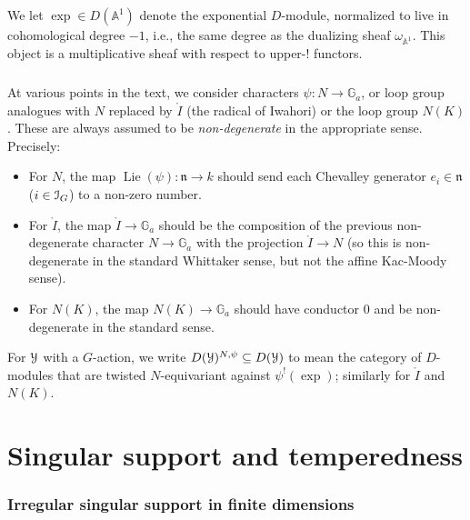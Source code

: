 \documentclass[reqno,11pt]{amsart}
\numberwithin{equation}{subsection}
\theoremstyle{remark}
\newcommand{\bA}{{\mathbb A}}
\newcommand{\bG}{{\mathbb G}}
\newcommand{\sI}{{\EuScript I}}
\newcommand{\sY}{{\EuScript Y}}
\newcommand{\fn}{{\mathfrak n}}
\newcommand{\on}{\operatorname}
\newcommand{\Lie}{\on{Lie}}
\renewcommand{\o}[1]{\mathring{#1}}
\renewcommand{\subset}{\subseteq}
\begin{document}
\subsubsection{}

We let $\exp \in D(\bA^1)$ denote the exponential $D$-module, normalized
to live in cohomological degree $-1$, i.e., the same degree as 
the dualizing sheaf $\omega_{\bA^1}$. This object is a multiplicative sheaf
with respect to upper-$!$ functors.

\subsubsection{}

At various points in the text, we consider characters $\psi:N \to \bG_a$, or
loop group analogues with $N$ replaced by $\o{I}$ (the radical of
Iwahori) or the loop group $N(K)$. These are always assumed to be
\emph{non-degenerate} in the appropriate sense. Precisely:

\begin{itemize}

\item For $N$, the map $\Lie(\psi):\fn \to k$ should send each Chevalley generator
$e_i \in \fn$ ($i \in \sI_G$) to a non-zero number.

\item For $\o{I}$, the map $\o{I} \to \bG_a$ should be the composition
of the previous non-degenerate character $N \to \bG_a$ with
the projection $\o{I} \to N$ (so this is non-degenerate in the
standard Whittaker sense, but not the affine Kac-Moody sense).

\item For $N(K)$, the map $N(K) \to \bG_a$ should have conductor $0$ and
be non-degenerate in the standard sense.

\end{itemize}

For $\sY$ with a $G$-action, we write $D(\sY)^{N,\psi} \subset D(\sY)$ to mean
the category of $D$-modules that are twisted $N$-equivariant
against $\psi^!(\exp)$; similarly for $\o{I}$ and $N(K)$.

\part{Singular support and temperedness}

\section{Irregular singular support in finite dimensions}\label{s:irreg-finite}
\end{document}
